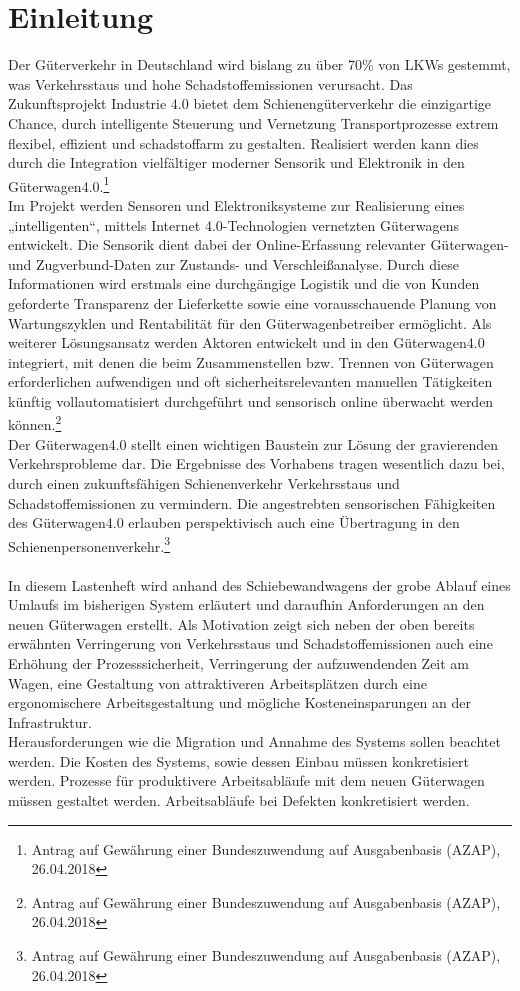 \section{Einleitung}
Der Güterverkehr in Deutschland wird bislang zu über 70\% von LKWs gestemmt, was Verkehrsstaus und hohe Schadstoffemissionen verursacht. Das Zukunftsprojekt Industrie 4.0 bietet dem Schienengüterverkehr die einzigartige Chance, durch intelligente Steuerung und Vernetzung Transportprozesse extrem flexibel, effizient und schadstoffarm zu gestalten. Realisiert werden kann dies durch die Integration vielfältiger moderner Sensorik und Elektronik in den Güterwagen4.0.\footnote{Antrag auf Gewährung einer Bundeszuwendung auf Ausgabenbasis (AZAP), 26.04.2018}\\
Im Projekt werden Sensoren und Elektroniksysteme zur Realisierung eines „intelligenten“, mittels Internet 4.0-Technologien vernetzten Güterwagens entwickelt. Die Sensorik dient dabei der Online-Erfassung relevanter Güterwagen- und Zugverbund-Daten zur Zustands- und Verschleißanalyse. Durch diese Informationen wird erstmals eine durchgängige Logistik und die von Kunden geforderte Transparenz der Lieferkette sowie eine vorausschauende Planung von Wartungszyklen und Rentabilität für den Güterwagenbetreiber ermöglicht. Als weiterer Lösungsansatz werden Aktoren entwickelt und in den Güterwagen4.0 integriert, mit denen die beim Zusammenstellen bzw. Trennen von Güterwagen erforderlichen aufwendigen und oft sicherheitsrelevanten manuellen Tätigkeiten künftig vollautomatisiert durchgeführt und sensorisch online überwacht werden können.\footnote{Antrag auf Gewährung einer Bundeszuwendung auf Ausgabenbasis (AZAP), 26.04.2018}\\
Der Güterwagen4.0 stellt einen wichtigen Baustein zur Lösung der gravierenden Verkehrsprobleme dar. Die Ergebnisse des Vorhabens tragen wesentlich dazu bei, durch einen zukunftsfähigen Schienenverkehr Verkehrsstaus und Schadstoffemissionen zu vermindern. Die angestrebten sensorischen Fähigkeiten des Güterwagen4.0 erlauben perspektivisch auch eine Übertragung in den Schienenpersonenverkehr.\footnote{Antrag auf Gewährung einer Bundeszuwendung auf Ausgabenbasis (AZAP), 26.04.2018}\\\\
In diesem Lastenheft wird anhand des Schiebewandwagens der grobe Ablauf eines Umlaufs im bisherigen System erläutert und daraufhin Anforderungen an den neuen Güterwagen erstellt. Als Motivation zeigt sich neben der oben bereits erwähnten Verringerung von Verkehrsstaus und Schadstoffemissionen auch eine Erhöhung der Prozesssicherheit, Verringerung der aufzuwendenden Zeit am Wagen, eine Gestaltung von attraktiveren Arbeitsplätzen durch eine ergonomischere Arbeitsgestaltung und mögliche Kosteneinsparungen an der Infrastruktur.\\
Herausforderungen wie die Migration und Annahme des Systems sollen beachtet werden. Die Kosten des Systems, sowie dessen Einbau müssen konkretisiert werden. Prozesse für produktivere Arbeitsabläufe mit dem neuen Güterwagen müssen gestaltet werden. Arbeitsabläufe bei Defekten konkretisiert werden.\\

